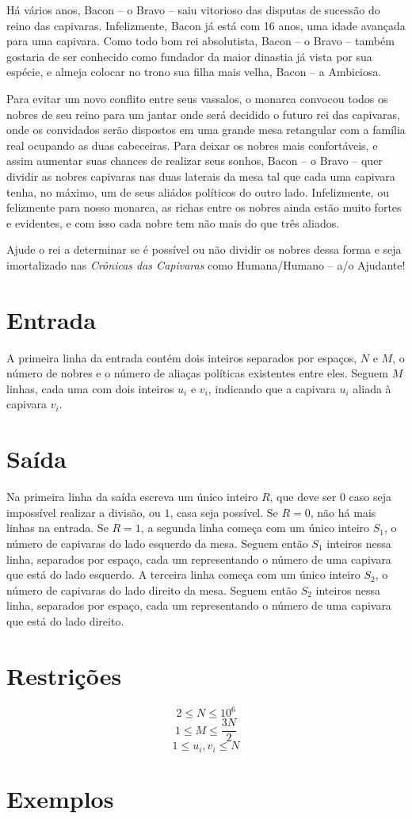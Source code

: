 Há vários anos, Bacon -- o Bravo -- saiu vitorioso das disputas de sucessão do reino das capivaras.
Infelizmente, Bacon já está com 16 anos, uma idade avançada para uma capivara.
Como todo bom rei absolutista, Bacon -- o Bravo -- também gostaria de ser conhecido como fundador
da maior dinastia já vista por sua espécie, e almeja colocar no trono sua filha mais velha,
Bacon -- a Ambiciosa.

Para evitar um novo conflito entre seus vassalos, o monarca convocou todos os nobres de seu reino
para um jantar onde será decidido o futuro rei das capivaras, onde os convidados serão dispostos em uma
grande mesa retangular com a família real ocupando as duas cabeceiras.
Para deixar os nobres mais confortáveis, e assim aumentar suas chances de realizar seus sonhos,
Bacon -- o Bravo -- quer dividir as nobres capivaras nas duas laterais da mesa tal que cada uma capivara tenha,
no máximo, um de seus aliádos políticos do outro lado.
Infelizmente, ou felizmente para nosso monarca, as richas entre os nobres ainda estão muito fortes e evidentes,
e com isso cada nobre tem não mais do que três aliados.

Ajude o rei a determinar se é possível ou não dividir os nobres dessa forma e seja imortalizado nas 
\textit{Crônicas das Capivaras} como Humana/Humano -- a/o Ajudante!

\section*{Entrada}

A primeira linha da entrada contém dois inteiros separados por espaços, $N$ e $M$, o número de nobres e o número
de aliaças políticas existentes entre eles.
Seguem $M$ linhas, cada uma com dois inteiros $u_i$ e $v_i$, indicando que a capivara $u_i$ aliada à capivara $v_i$.

\section*{Saída}

Na primeira linha da saída escreva um único inteiro $R$, que deve ser $0$ caso seja impossível realizar a divisão,
ou $1$, casa seja possível.
Se $R = 0$, não há mais linhas na entrada.
Se $R = 1$, a segunda linha começa com um único inteiro $S_1$, o número de capivaras do lado esquerdo da mesa.
Seguem então $S_1$ inteiros nessa linha, separados por espaço, cada um representando o número de uma capivara que está do lado esquerdo.
A terceira linha começa com um único inteiro $S_2$, o número de capivaras do lado direito da mesa.
Seguem então $S_2$ inteiros nessa linha, separados por espaço, cada um representando o número de uma capivara que está do lado direito.


\section*{Restrições}

$$2 \leq N \leq 10^{6}$$
$$1 \leq M \leq \frac{3N}{2}$$
$$1 \leq u_i, v_i \leq N$$

\section*{Exemplos}
\exemplo
